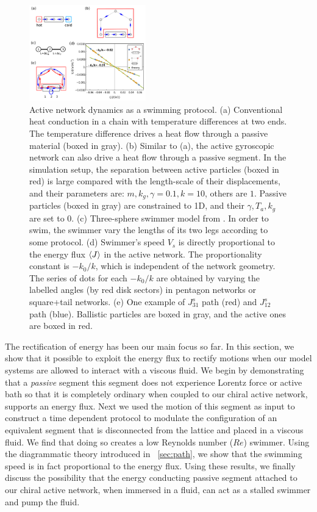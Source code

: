 \documentclass[
 preprint,
 preprintnumbers,
 amsmath,amssymb,
 aps,
 pre,
 longbibliography,
 superscriptaddress,
 10pt, twocolumn
]{revtex4-1}
\begin{document}
\begin{figure}[ht]
	\centering
	\includegraphics[width=0.45\textwidth]{7_swimmer.pdf}
    \caption{Active network dynamics as a swimming protocol.
    (a) Conventional heat conduction in a chain with temperature differences at two ends. The temperature difference drives a heat flow through a passive material (boxed in gray).
    (b) Similar to (a), the active gyroscopic network can also drive a heat flow through a passive segment. In the simulation setup, the separation between active particles (boxed in red) is large compared with the length-scale of their displacements, and their parameters are: $m,k_g,\gamma=0.1, k=10$, others are $1$. Passive particles (boxed in gray) are constrained to 1D, and their $\gamma,T_a,k_g$ are set to $0$.
    (c) Three-sphere swimmer model from \cite{Golestanian2008AnalyticResults}. In order to swim, the swimmer vary the lengths of its two legs according to some protocol.
    (d) Swimmer's speed $V_s$ is directly proportional to the energy flux $\expval{J}$ in the active network. The proportionality constant is $-k_0/k$, which is independent of the network geometry. The series of dots for each $-k_0/k$ are obtained by varying the labelled angles (by red disk sectors) in pentagon networks or square+tail networks.
    (e) One example of $J_{31}^s$ path (red) and $J_{12}^s$ path (blue). Ballistic particles are boxed in gray, and the active ones are boxed in red.
    }
    \label{fig:swimmer}
\end{figure}


The rectification of energy has been our main focus so far. In this section, we show that it possible to exploit the energy flux to rectify motions when our model systems are allowed to interact with a viscous fluid.
We begin by demonstrating that a {\it passive} segment \textendash this segment does not experience Lorentz force or active bath so that it is completely ordinary \textendash when coupled to our chiral active network, supports an energy flux.
Next we used the motion of this segment as input to construct a time dependent protocol to modulate the configuration of an equivalent segment that is disconnected from the lattice and placed in a viscous fluid. We find that doing so creates a low Reynolds number ($Re$) swimmer. Using the diagrammatic theory introduced in \secname~\ref{sec:path}, we show that the swimming speed is in fact proportional to the energy flux.
Using these results, we finally discuss the possibility that the energy conducting passive segment attached to our chiral active network, when immersed in a fluid, can act as a stalled swimmer and pump the fluid.
\end{document}
